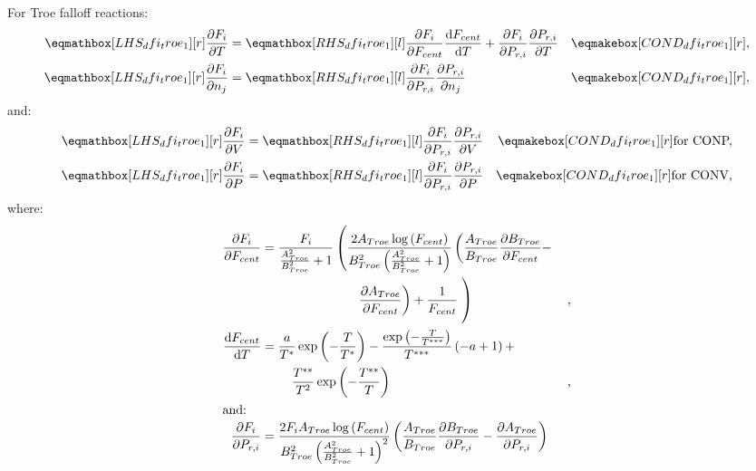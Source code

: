 \documentclass[12pt]{article}
\newcommand{\conp}{CONP}
\newcommand{\conv}{CONV}
\newcommand{\dconp}{\ifmmode\text{for \conp,}\else for \conp,\fi}
\newcommand{\dconv}{\ifmmode\text{for \conv,}\else for \conv.\fi}
\begin{document}
For Troe falloff reactions:
\begin{align}
 \lhs{dfi_troe_1}{\frac{\partial F_{i} }{\partial T }} &= \rhs{dfi_troe_1}{\frac{\partial F_{i} }{\partial F_{cent} } \frac{\text{d} F_{cent} }{\text{d} T } + \frac{\partial F_{i} }{\partial P_{r, i} } \frac{\partial P_{r, i} }{\partial T }} & \cond{dfi_troe_1}{,} \label{e:dfi_troe_dt} \\
 \lhs{dfi_troe_1}{\frac{\partial F_{i} }{\partial n_j}} &= \rhs{dfi_troe_1}{\frac{\partial F_{i} }{\partial P_{r, i} } \frac{\partial P_{r, i} }{\partial n_j }} & \cond{dfi_troe_1}{,} \label{e:dfi_troe_dnj}
\end{align}
and:
\begin{subequations}
 \label{e:dfi_troe_de}
 \begin{align}
 \lhs{dfi_troe_1}{\frac{\partial F_{i} }{\partial V }} &= \rhs{dfi_troe_1}{\frac{\partial F_{i} }{\partial P_{r, i} } \frac{\partial P_{r, i} }{\partial V }} & \cond{dfi_troe_1}{\dconp} \\
 \lhs{dfi_troe_1}{\frac{\partial F_{i} }{\partial P }} &= \rhs{dfi_troe_1}{\frac{\partial F_{i} }{\partial P_{r, i} } \frac{\partial P_{r, i} }{\partial P }} & \cond{dfi_troe_1}{\dconv}
 \end{align}
\end{subequations}
where:
\begin{align}
 \frac{\partial F_{i} }{\partial F_{cent} } &= \frac{F_{i}}{\frac{A_{Troe}^{2}}{B_{Troe}^{2}} + 1} \left(\frac{2 A_{Troe} \log{\left (F_{cent} \right )}}{B_{Troe}^{2} \left(\frac{A_{Troe}^{2}}{B_{Troe}^{2}} + 1\right)} \left(\frac{A_{Troe}}{B_{Troe}} \frac{\partial B_{Troe} }{\partial F_{cent} } - \right. \right. & \nonumber \\
 & \mathindent[morespaceplease] \left. \frac{\partial A_{Troe} }{\partial F_{cent} }\right) + \frac{1}{F_{cent}} \left. \vphantom{\frac{F_{i}}{\frac{A_{Troe}^{2}}{B_{Troe}^{2}} + 1}} \right) & \text{,} \label{e:dfi_troe_dfcent_partial} \\
\frac{\text{d} F_{cent} }{\text{d} T } &= \frac{a}{T^{*}} \operatorname{exp}\left({- \frac{T}{T^{*}}}\right) - \frac{\operatorname{exp}\left({- \frac{T}{T^{***}}}\right)}{T^{***}} \left(- a + 1\right) + & \nonumber \\
 & \mathindent \frac{T^{**}}{T^{2}} \operatorname{exp}\left({- \frac{T^{**}}{T}}\right) & \text{,} \label{e:dfcent_dt} \\
\intertext{and:}
\frac{\partial F_{i} }{\partial P_{r, i} } &= \frac{2 F_{i} A_{Troe} \log{\left (F_{cent} \right )}}{B_{Troe}^{2} \left(\frac{A_{Troe}^{2}}{B_{Troe}^{2}} + 1\right)^{2}} \left(\frac{A_{Troe}}{B_{Troe}} \frac{\partial B_{Troe} }{\partial P_{r, i} } - \frac{\partial A_{Troe} }{\partial P_{r, i} }\right) \label{e:dfi_troe_dpr_partial}
\end{align}
\end{document}
